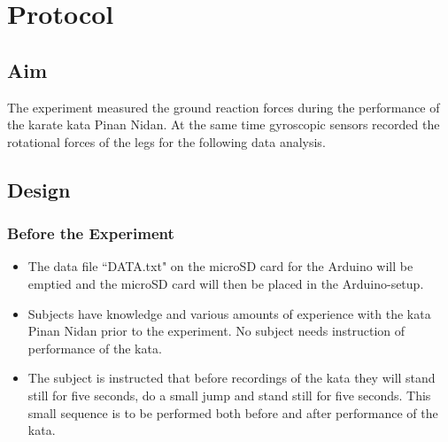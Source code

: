 \section{Protocol}
\subsection{Aim}
The experiment measured the ground reaction forces during the performance of the karate kata Pinan Nidan. At the same time gyroscopic sensors recorded the rotational forces of the legs for the following data analysis.

\subsection{Design}
\subsubsection{Before the Experiment}
\begin{itemize}
\item The data file “DATA.txt" on the microSD card for the Arduino will be emptied and the microSD card will then be placed in the Arduino-setup. 
\item Subjects have knowledge and various amounts of experience with the kata Pinan Nidan prior to the experiment. No subject needs instruction of performance of the kata.
\item The subject is instructed that before recordings of the kata they will stand still for five seconds, do a small jump and stand still for five seconds. This small sequence is to be performed both before and after performance of the kata.
\end{itemize}


